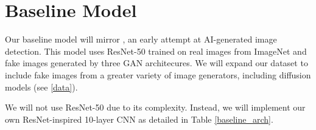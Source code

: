 \documentclass{article} %
\begin{document}


\section{Baseline Model}
\label{baseline}

Our baseline model will mirror \citet{wang2020cnngeneratedimagessurprisinglyeasy}, an early attempt at AI-generated image detection. This model uses ResNet-50 trained on real images from ImageNet and fake images generated by three GAN architecures. We will expand our dataset to include fake images from a greater variety of image generators, including diffusion models (see \ref{data}).

We will not use ResNet-50 due to its complexity. Instead, we will implement our own ResNet-inspired 10-layer CNN as detailed in Table \ref{baseline_arch}.
\end{document}
